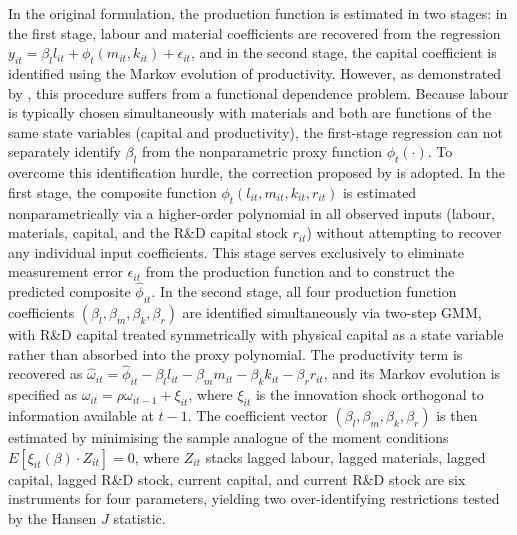 \documentclass[a4paper, 12pt]{article}
\begin{document}
In the original \textcite{levinsohn2003estimating} formulation, the production function is estimated in two stages: in the first stage, labour and material coefficients are recovered from the regression $y_{it} = \beta_l l_{it} + \phi_t(m_{it}, k_{it}) + \epsilon_{it}$, and in the second stage, the capital coefficient is identified using the Markov evolution of productivity. However, as demonstrated by \textcite{ackerberg2015identification}, this procedure suffers from a functional dependence problem. Because labour is typically chosen simultaneously with materials and both are functions of the same state variables (capital and productivity), the first-stage regression can not separately identify $\beta_l$ from the nonparametric proxy function $\phi_t(\cdot)$. To overcome this identification hurdle, the correction proposed by \textcite{ackerberg2015identification} is adopted. In the first stage, the composite function $\phi_t(l_{it}, m_{it}, k_{it}, r_{it})$ is estimated nonparametrically via a higher-order polynomial in all observed inputs (labour, materials, capital, and the R\&D capital stock $r_{it}$) without attempting to recover any individual input coefficients. This stage serves exclusively to eliminate measurement error $\epsilon_{it}$ from the production function and to construct the predicted composite $\hat{\phi}_{it}$. In the second stage, all four production function coefficients $(\beta_l, \beta_m, \beta_k, \beta_r)$ are identified simultaneously via two-step GMM, with R\&D capital treated symmetrically with physical capital as a state variable rather than absorbed into the proxy polynomial. The productivity term is recovered as $\hat{\omega}_{it} = \hat{\phi}_{it} - \beta_l l_{it} - \beta_m m_{it} - \beta_k k_{it} - \beta_r r_{it}$, and its Markov evolution is specified as $\omega_{it} = \rho \omega_{it-1} + \xi_{it}$, where $\xi_{it}$ is the innovation shock orthogonal to information available at $t-1$. The coefficient vector $(\beta_l, \beta_m, \beta_k, \beta_r)$ is then estimated by minimising the sample analogue of the moment conditions $E[\xi_{it}(\beta) \cdot Z_{it}] = 0$, where $Z_{it}$ stacks lagged labour, lagged materials, lagged capital, lagged R\&D stock, current capital, and current R\&D stock are six instruments for four parameters, yielding two over-identifying restrictions tested by the Hansen $J$ statistic.
\end{document}
